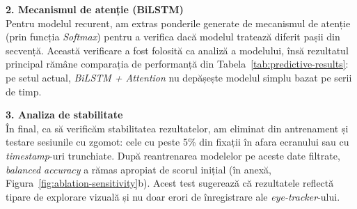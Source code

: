 \textbf{2. Mecanismul de atenție (BiLSTM)} \\
Pentru modelul recurent, am extras ponderile generate de mecanismul de atenție (prin funcția \emph{Softmax}) pentru a verifica dacă modelul tratează diferit pașii din secvență. Această verificare a fost folosită ca analiză a modelului, însă rezultatul principal rămâne comparația de performanță din Tabela~\ref{tab:predictive-results}: pe setul actual, \emph{BiLSTM + Attention} nu depășește modelul  simplu bazat pe serii de timp.

\textbf{3. Analiza de stabilitate} \\
În final, ca să verificăm stabilitatea rezultatelor, am eliminat din antrenament și testare sesiunile cu zgomot: cele cu peste 5\% din fixații în afara ecranului sau cu \emph{timestamp}-uri trunchiate. După reantrenarea modelelor pe aceste date filtrate, \emph{balanced accuracy} a rămas apropiat de scorul inițial (în anexă, Figura~\ref{fig:ablation-sensitivity}b). Acest test sugerează că rezultatele reflectă tipare de explorare vizuală și nu doar erori de înregistrare ale \emph{eye-tracker}-ului.

%
%
%
%

